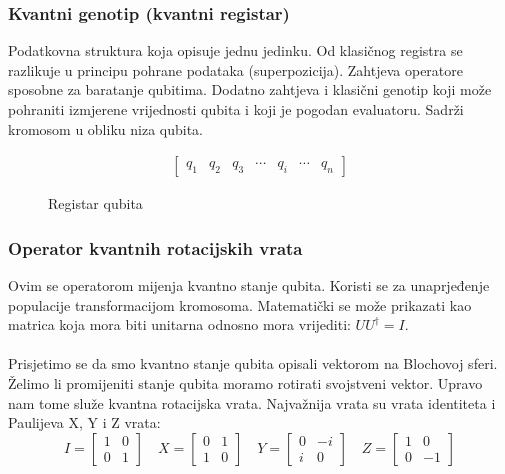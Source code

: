 \documentclass[times, utf8, zavrsni, numeric]{fer}
\begin{document}
\subsubsection{Kvantni genotip (kvantni registar)}
Podatkovna struktura koja opisuje jednu jedinku. Od klasičnog registra se razlikuje u principu pohrane podataka (superpozicija). Zahtjeva operatore sposobne za baratanje qubitima. Dodatno zahtjeva i klasični genotip koji može pohraniti izmjerene vrijednosti qubita i koji je pogodan evaluatoru. Sadrži kromosom u obliku niza qubita.
\begin{figure}[htb]
\centering
\begin{align*}
\begin{bmatrix}
q_1 & q_2 & q_3 & \cdots & q_i & \cdots & q_n
\end{bmatrix}
\end{align*}
\caption{Registar qubita}
\end{figure}

\subsubsection{Operator kvantnih rotacijskih vrata}
Ovim se operatorom mijenja kvantno stanje qubita. Koristi se za unaprjeđenje populacije transformacijom kromosoma. Matematički se može prikazati kao matrica koja mora biti unitarna odnosno mora vrijediti: $UU^{\dagger} = I$.

\paragraph{}
Prisjetimo se da smo kvantno stanje qubita opisali vektorom na Blochovoj sferi. Želimo li promijeniti stanje qubita moramo rotirati svojstveni vektor. Upravo nam tome služe kvantna rotacijska vrata. Najvažnija vrata su vrata identiteta i Paulijeva X, Y i Z vrata:
\begin{equation}
I = 
\begin{bmatrix}
1 & 0 \\ 0 & 1
\end{bmatrix} \quad
X = 
\begin{bmatrix}
0 & 1 \\ 1 & 0
\end{bmatrix} \quad
Y = 
\begin{bmatrix}
0 & -i \\ i & 0
\end{bmatrix} \quad
Z = 
\begin{bmatrix}
1 & 0 \\ 0 & -1
\end{bmatrix}
\end{equation}
\end{document}
